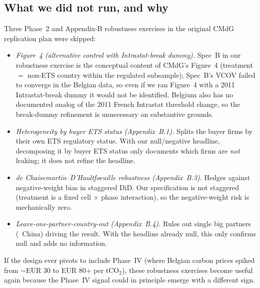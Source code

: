 \subsection{What we did not run, and why}\label{sec:across:notpursued}

Three Phase~2 and Appendix-B robustness exercises in the original CMdG replication plan were skipped:
\begin{itemize}
    \item \emph{Figure~4 (alternative control with Intrastat-break dummy).} Spec~B in our robustness exercise is the conceptual content of CMdG's Figure~4 (treatment $=$ non-ETS country within the regulated subsample); Spec~B's VCOV failed to converge in the Belgian data, so even if we ran Figure~4 with a 2011 Intrastat-break dummy it would not be identified. Belgium also has no documented analog of the 2011 French Intrastat threshold change, so the break-dummy refinement is unnecessary on substantive grounds.
    \item \emph{Heterogeneity by buyer ETS status (Appendix~B.1).} Splits the buyer firms by their own ETS regulatory status. With our null/negative headline, decomposing it by buyer ETS status only documents which firms are \emph{not} leaking; it does not refine the headline.
    \item \emph{de Chaisemartin--D'Haultfoeuille robustness (Appendix~B.3).} Hedges against negative-weight bias in staggered DiD. Our specification is not staggered (treatment is a fixed cell $\times$ phase interaction), so the negative-weight risk is mechanically zero.
    \item \emph{Leave-one-partner-country-out (Appendix~B.4).} Rules out single big partners (\eg\ China) driving the result. With the headline already null, this only confirms null and adds no information.
\end{itemize}
If the design ever pivots to include Phase~IV (where Belgian carbon prices spiked from $\sim$EUR 30 to EUR 80+ per tCO$_2$), these robustness exercises become useful again because the Phase~IV signal could in principle emerge with a different sign.
